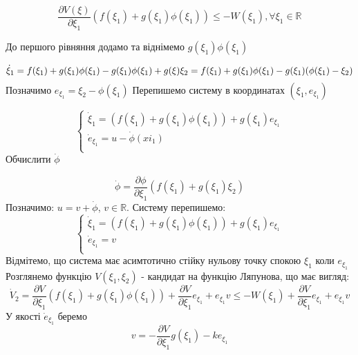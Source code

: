 \documentclass{article}
\begin{document}
\begin{equation}
    \frac{\partial V(\xi)}{\partial \xi_1}(f(\xi_1)+g(\xi_1)\phi(\xi_1)) \leq
    -W(\xi_1), \forall \xi_1 \in \mathbb{R}
\end{equation}

До першого рівняння додамо та віднімемо $g(\xi_1)\phi(\xi_1)$

\begin{equation}
\dot\xi_1 = f(\xi_1)+g(\xi_1)\phi(\xi_1)-g(\xi_1)\phi(\xi_1)+g(\xi)\xi_2 =\\
f(\xi_1)+g(\xi_1)\phi(\xi_1)-g(\xi_1)(\phi(\xi_1)-\xi_2)
\end{equation}
Позначимо $e_{\xi_1} = \xi_2-\phi(\xi_1)$
Перепишемо систему в координатах $(\xi_1, e_{\xi_1})$

\begin{equation}
    \begin{cases}
    \dot \xi_1 = (f(\xi_1)+g(\xi_1)\phi(\xi_1))+g(\xi_1)e_{\xi_1}\\
    \dot e_{\xi_1} = u-\dot \phi(xi_1)\\  
    \end{cases}
\end{equation}
Обчислити $\dot\phi$ 

\begin{equation}
    \dot\phi = \frac{\partial \phi}{\partial \xi_1}(f(\xi_1)+g(\xi_1)\xi_2)
\end{equation}
Позначимо: $u = v + \dot\phi$, $v \in \mathbb{R}$.
Систему перепишемо:
\begin{equation}
    \begin{cases}
        \dot \xi_1 = (f(\xi_1)+g(\xi_1)\phi(\xi_1))+g(\xi_1)e_{\xi_1}\\
        \dot e_{\xi_1} = v\\
    \end{cases}
\end{equation}
Відмітемо, що система має асимтотично стійку нульову точку спокою $\xi_1$ коли $e_{\xi_1}$
Розглянемо функцію $V(\xi_1,\xi_2)$ - кандидат на функцію Ляпунова, що має вигляд:
\begin{equation}
    \dot V_2 = \frac{\partial V}{\partial \xi_1}(f(\xi_1)+g(\xi_1)\phi(\xi_1))+
    \frac{\partial V}{\partial \xi_1}e_{\xi_1}+e_{\xi_1}v \leq -W(\xi_1)+
    \frac{\partial V}{\partial \xi_1}e_{\xi_1}+e_{\xi_1}v
\end{equation}
У якості $\dot e_{\xi_1}$ беремо 
\begin{equation}
    v = - \frac{\partial V}{\partial \xi_1}g(\xi_1) - ke_{\xi_1}
\end{equation}
\end{document}
